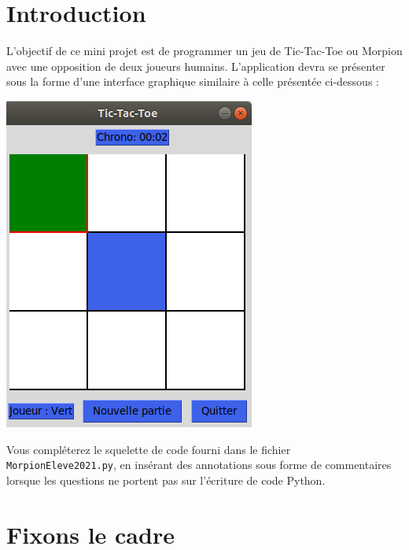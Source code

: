 \documentclass[a4paper, french, 12pt]{article}  %
\begin{document}
\section*{Introduction}

L'objectif de ce mini projet est de programmer un jeu de Tic-Tac-Toe ou Morpion avec une opposition de deux joueurs humains. L'application devra se présenter sous la forme d'une interface graphique similaire à celle présentée ci-dessous :

\begin{center}
\includegraphics[scale=0.5]{graphiques/morpion.png}
\end{center}

Vous compléterez le squelette de code fourni dans le fichier \texttt{MorpionEleve2021.py},  en insérant des  annotations sous forme de commentaires lorsque les questions ne portent pas sur l'écriture de code Python.


\section{Fixons le cadre}
\end{document}
